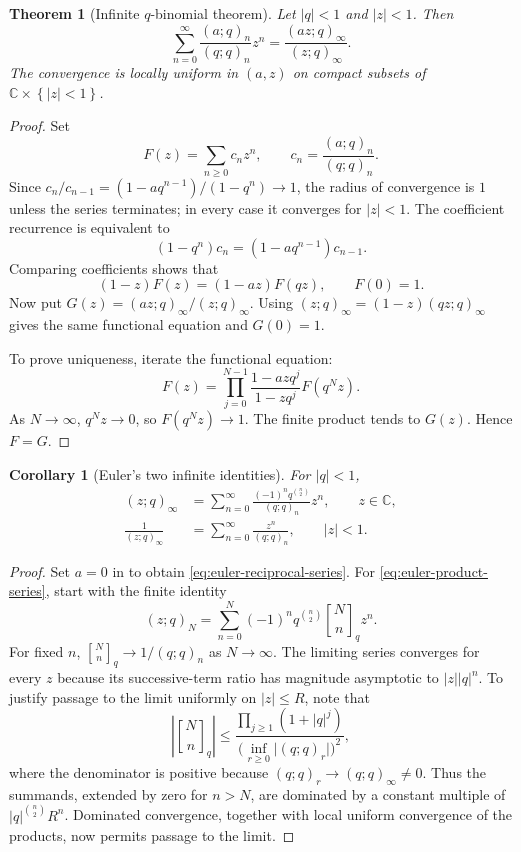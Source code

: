\documentclass[11pt,oneside,openany]{book}
\newtheorem{theorem}{Theorem}[chapter]
\newtheorem{corollary}[corollary]{Corollary}
\theoremstyle{definition}
\theoremstyle{remark}
\newcommand{\Qbinom}[3]{\genfrac{[}{]}{0pt}{}{#1}{#2}_{#3}}
\newcommand{\C}{\mathbb C}
\newcommand{\abs}[1]{\lvert #1\rvert}
\newcommand{\set}[1]{\left\{#1\right\}}
\begin{document}
\begin{theorem}[Infinite $q$-binomial theorem]\label{thm:infinite-qbinomial}
Let $\abs q<1$ and $\abs z<1$.  Then
\[
 \sum_{n=0}^{\infty}\frac{(a;q)_n}{(q;q)_n}z^n
 =\frac{(az;q)_\infty}{(z;q)_\infty}.
\]
The convergence is locally uniform in $(a,z)$ on compact subsets of $\C\times\set{\abs z<1}$.
\end{theorem}

\begin{proof}
Set
\[
 F(z)=\sum_{n\ge0}c_nz^n,
 \qquad c_n=\frac{(a;q)_n}{(q;q)_n}.
\]
Since $c_{n}/c_{n-1}=(1-aq^{n-1})/(1-q^n)\to1$, the radius of convergence is $1$ unless the series terminates; in every case it converges for $\abs z<1$.  The coefficient recurrence is equivalent to
\[
 (1-q^n)c_n=(1-aq^{n-1})c_{n-1}.
\]
Comparing coefficients shows that
\[
 (1-z)F(z)=(1-az)F(qz),\qquad F(0)=1.\label{eq:qbinom-fe}
\]
Now put
\(
 G(z)=(az;q)_\infty/(z;q)_\infty.
\)
Using $(z;q)_\infty=(1-z)(qz;q)_\infty$ gives the same functional equation and $G(0)=1$.

To prove uniqueness, iterate the functional equation:
\[
 F(z)=\prod_{j=0}^{N-1}\frac{1-azq^j}{1-zq^j}F(q^Nz).
\]
As $N\to\infty$, $q^Nz\to0$, so $F(q^Nz)\to1$.  The finite product tends to $G(z)$.  Hence $F=G$.
\end{proof}

\begin{corollary}[Euler's two infinite identities]\label{cor:euler-infinite}
For $\abs q<1$,
\begin{align}
 (z;q)_\infty
 &=\sum_{n=0}^{\infty}\frac{(-1)^nq^{\binom n2}}{(q;q)_n}z^n,
 \qquad z\in\C,\label{eq:euler-product-series}\\
 \frac1{(z;q)_\infty}
 &=\sum_{n=0}^{\infty}\frac{z^n}{(q;q)_n},
 \qquad \abs z<1.\label{eq:euler-reciprocal-series}
\end{align}
\end{corollary}

\begin{proof}
Set $a=0$ in  to obtain \eqref{eq:euler-reciprocal-series}.  For \eqref{eq:euler-product-series}, start with the finite identity
\[
 (z;q)_N=\sum_{n=0}^{N}(-1)^nq^{\binom n2}\Qbinom Nnq z^n.
\]
For fixed $n$, $\Qbinom Nnq\to1/(q;q)_n$ as $N\to\infty$.  The limiting series converges for every $z$ because its successive-term ratio has magnitude asymptotic to $\abs z\abs q^n$.  To justify passage to the limit uniformly on $\abs z\le R$, note that
\[
 \left|\Qbinom Nnq\right|
 \le
 \frac{\prod_{j\ge1}(1+\abs q^j)}
      {\bigl(\inf_{r\ge0}\abs{(q;q)_r}\bigr)^{2}},
\]
where the denominator is positive because $(q;q)_r\to(q;q)_\infty\ne0$.  Thus the summands, extended by zero for $n>N$, are dominated by a constant multiple of $\abs q^{\binom n2}R^n$.  Dominated convergence, together with local uniform convergence of the products, now permits passage to the limit.
\end{proof}
\end{document}
